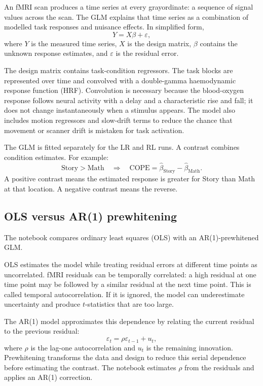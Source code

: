 \documentclass[11pt,a4paper]{article}
\begin{document}
An fMRI scan produces a time series at every grayordinate: a sequence of signal values across the scan. The GLM explains that time series as a combination of modelled task responses and nuisance effects. In simplified form,
\[
    Y = X\beta + \varepsilon,
\]
where \(Y\) is the measured time series, \(X\) is the design matrix, \(\beta\) contains the unknown response estimates, and \(\varepsilon\) is the residual error.

The design matrix contains task-condition regressors. The task blocks are represented over time and convolved with a double-gamma haemodynamic response function (HRF). Convolution is necessary because the blood-oxygen response follows neural activity with a delay and a characteristic rise and fall; it does not change instantaneously when a stimulus appears. The model also includes motion regressors and slow-drift terms to reduce the chance that movement or scanner drift is mistaken for task activation.

The GLM is fitted separately for the LR and RL runs. A contrast combines condition estimates. For example:
\[
    \text{Story} > \text{Math}
    \quad\Longrightarrow\quad
    \text{COPE} = \widehat{\beta}_{\text{Story}} -
                  \widehat{\beta}_{\text{Math}}.
\]
A positive contrast means the estimated response is greater for Story than Math at that location. A negative contrast means the reverse.

\subsection{OLS versus AR(1) prewhitening}

The notebook compares ordinary least squares (OLS) with an AR(1)-prewhitened GLM.

OLS estimates the model while treating residual errors at different time points as uncorrelated. fMRI residuals can be temporally correlated: a high residual at one time point may be followed by a similar residual at the next time point. This is called temporal autocorrelation. If it is ignored, the model can underestimate uncertainty and produce \(t\)-statistics that are too large.

The AR(1) model approximates this dependence by relating the current residual to the previous residual:
\[
    \varepsilon_t = \rho\varepsilon_{t-1} + u_t,
\]
where \(\rho\) is the lag-one autocorrelation and \(u_t\) is the remaining innovation. Prewhitening transforms the data and design to reduce this serial dependence before estimating the contrast. The notebook estimates \(\rho\) from the residuals and applies an AR(1) correction.
\end{document}
